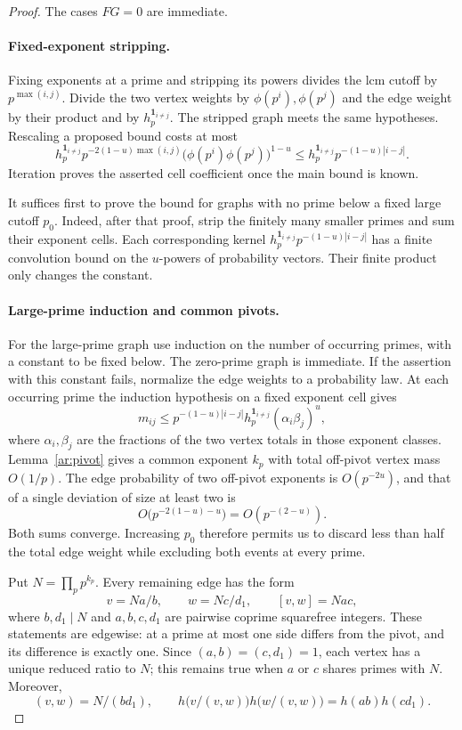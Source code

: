 \begin{proof}
The cases $FG=0$ are immediate.

\paragraph{Fixed-exponent stripping.}
Fixing exponents at a prime and stripping
its powers divides the lcm cutoff by $p^{\max(i,j)}$. Divide the two
vertex weights by $\phi(p^i),\phi(p^j)$ and the edge weight by their
product and by $h_p^{\mathbf1_{i\ne j}}$. The stripped graph meets the
same hypotheses. Rescaling a proposed bound costs at most
\[
 h_p^{\mathbf1_{i\ne j}}
 p^{-2(1-u)\max(i,j)}
 \bigl(\phi(p^i)\phi(p^j)\bigr)^{1-u}
 \le h_p^{\mathbf1_{i\ne j}}p^{-(1-u)|i-j|}.
\]
Iteration proves the asserted cell coefficient once the main bound is
known.

It suffices first to prove the bound for graphs with no prime below a
fixed large cutoff $p_0$. Indeed, after that proof, strip the finitely
many smaller primes and sum their exponent cells. Each corresponding
kernel $h_p^{\mathbf1_{i\ne j}}p^{-(1-u)|i-j|}$ has a finite
convolution bound on the $u$-powers of probability vectors. Their
finite product only changes the constant.

\paragraph{Large-prime induction and common pivots.}
For the large-prime graph use induction on the number of occurring
primes, with a constant to be fixed below. The zero-prime graph is
immediate. If the assertion with this constant fails, normalize the
edge weights to a probability law. At each occurring prime the
induction hypothesis on a fixed exponent cell gives
\begin{equation}\label{eq:prime-cell}
 m_{ij}\le p^{-(1-u)|i-j|}
 h_p^{\mathbf1_{i\ne j}}(\alpha_i\beta_j)^u,
\end{equation}
where $\alpha_i,\beta_j$ are the fractions of the two vertex totals in
those exponent classes. Lemma~\ref{ar:pivot} gives a common exponent
$k_p$ with total off-pivot vertex mass $O(1/p)$. The edge probability
of two off-pivot exponents is $O(p^{-2u})$, and that of a single
deviation of size at least two is
\[
 O\bigl(p^{-2(1-u)-u}\bigr)=O(p^{-(2-u)}).
\]
Both sums converge. Increasing $p_0$ therefore permits us to discard
less than half the total edge weight while excluding both events at
every prime.

Put $N=\prod_pp^{k_p}$. Every remaining edge has the form
\[
 v=Na/b,\qquad w=Nc/d_1,\qquad [v,w]=Nac,
\]
where $b,d_1\mid N$ and $a,b,c,d_1$ are pairwise coprime squarefree
integers. These statements are edgewise: at a prime at most one side
differs from the pivot, and its difference is exactly one.
Since $(a,b)=(c,d_1)=1$, each vertex has a unique reduced ratio to $N$;
this remains true when $a$ or $c$ shares primes with $N$. Moreover,
\[
 (v,w)=N/(bd_1),\qquad
 h\bigl(v/(v,w)\bigr)h\bigl(w/(v,w)\bigr)=h(ab)h(cd_1).
\]


\end{proof}
